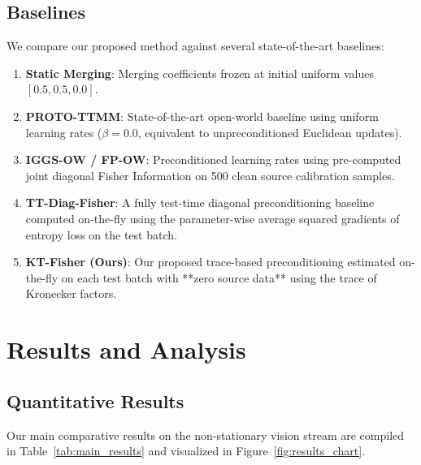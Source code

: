 \documentclass{article}
\theoremstyle{plain}
\theoremstyle{definition}
\theoremstyle{remark}
\begin{document}
\subsection{Baselines}
We compare our proposed method against several state-of-the-art baselines:
\begin{enumerate}
    \item \textbf{Static Merging}: Merging coefficients frozen at initial uniform values $[0.5, 0.5, 0.0]$.
    \item \textbf{PROTO-TTMM}: State-of-the-art open-world baseline using uniform learning rates ($\beta = 0.0$, equivalent to unpreconditioned Euclidean updates).
    \item \textbf{IGGS-OW / FP-OW}: Preconditioned learning rates using pre-computed joint diagonal Fisher Information on 500 clean source calibration samples.
    \item \textbf{TT-Diag-Fisher}: A fully test-time diagonal preconditioning baseline computed on-the-fly using the parameter-wise average squared gradients of entropy loss on the test batch.
    \item \textbf{KT-Fisher (Ours)}: Our proposed trace-based preconditioning estimated on-the-fly on each test batch with **zero source data** using the trace of Kronecker factors.
\end{enumerate}

\section{Results and Analysis}
\label{results}

\subsection{Quantitative Results}
Our main comparative results on the non-stationary vision stream are compiled in Table~\ref{tab:main_results} and visualized in Figure~\ref{fig:results_chart}.
\end{document}
